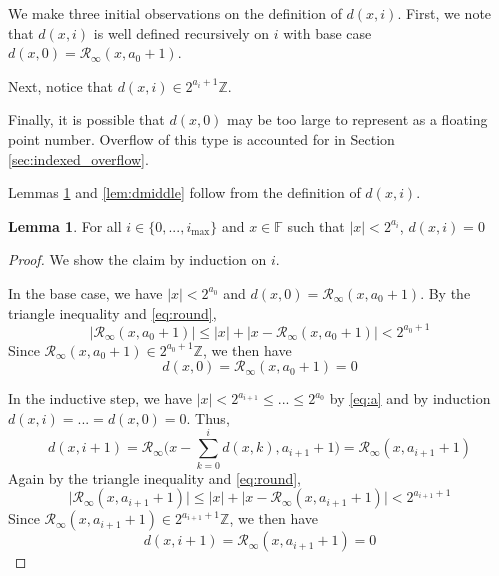 \documentclass[12pt]{article}
\providecommand{\F}{\ensuremath{\mathbb{F}}}
\providecommand{\Z}{\ensuremath{\mathbb{Z}}}
\providecommand{\max}{\ensuremath{\text{max}}}
\providecommand{\roundtonearestinfty}{\ensuremath{\mathcal{R}_\text{$\infty$}}}
\theoremstyle{definition}
\newtheorem{lem}[thm]{Lemma}
\numberwithin{equation}{section}
\numberwithin{figure}{section}
\begin{document}
    We make three initial observations on the definition of $d(x, i)$. First, we note that $d(x, i)$ is well defined recursively on $i$ with base case $d(x, 0) = \roundtonearestinfty(x, a_0 + 1)$.

    Next, notice that $d(x, i) \in 2^{a_{i} + 1}\Z$.

    Finally, it is possible that $d(x, 0)$ may be too large to represent as a floating point number. Overflow of this type is accounted for in Section \ref{sec:indexed_overflow}.

    Lemmas \ref{lem:dzero} and \ref{lem:dmiddle} follow from the definition of $d(x, i)$.

    \begin{samepage}
    \begin{lem}
      For all $i \in \{0, ..., i_{\max}\}$ and $x \in \F$ such that $|x| < 2^{a_i}$, $d(x, i) = 0$
      \label{lem:dzero}
    \end{lem}
    \end{samepage}

    \begin{proof}
      We show the claim by induction on $i$.

      In the base case, we have $|x| < 2^{a_0}$ and $d(x, 0) = \roundtonearestinfty(x, a_0 + 1)$. By the triangle inequality and  \eqref{eq:round},
      \begin{equation*}
        \bigl|\roundtonearestinfty(x, a_0 + 1)\bigr| \leq |x| + \bigl|x - \roundtonearestinfty(x, a_0 + 1)\bigr| < 2^{a_0 + 1}
      \end{equation*}
      Since $\roundtonearestinfty(x, a_0 + 1) \in 2^{a_0 + 1}\Z$, we then have
      \begin{equation*}
        d(x, 0) = \roundtonearestinfty(x, a_0 + 1) = 0
      \end{equation*}

      In the inductive step, we have $|x| < 2^{a_{i + 1}} \leq ... \leq 2^{a_0}$ by  \eqref{eq:a} and by induction $d(x, i)= ... = d(x, 0) = 0$. Thus,
      \begin{equation*}
        d(x, i + 1) = \roundtonearestinfty\bigl(x - \sum\limits_{k = 0}^{i}d(x, k), a_{i + 1} + 1\bigr) = \roundtonearestinfty(x, a_{i+1} + 1)
      \end{equation*}
      Again by the triangle inequality and  \eqref{eq:round},
      \begin{equation*}
        \bigl|\roundtonearestinfty(x, a_{i + 1} + 1)\bigr| \leq |x| + \bigl|x - \roundtonearestinfty(x, a_{i + 1} + 1)\bigr| < 2^{a_{i + 1} + 1}
      \end{equation*}
      Since $\roundtonearestinfty(x, a_{i + 1} + 1) \in 2^{a_{i + 1} + 1}\Z$, we then have
      \begin{equation*}
        d(x, i + 1) = \roundtonearestinfty(x, a_{i + 1} + 1) = 0
      \end{equation*}
    \end{proof}
\end{document}
